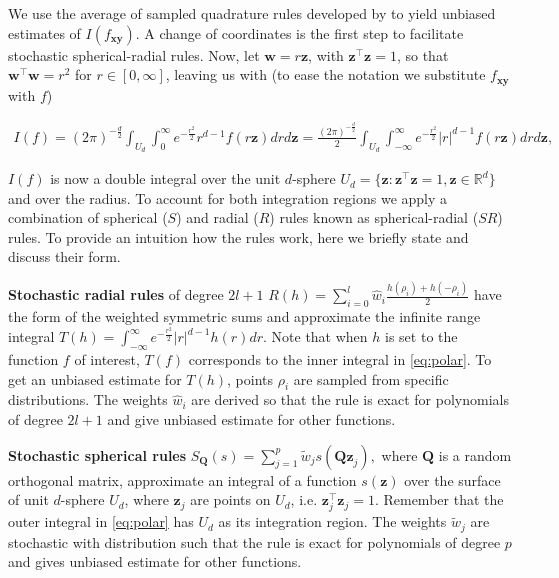 We use the average of sampled quadrature rules developed by \citep{genz1998stochastic} to yield unbiased estimates of $I(f_{\mathbf{xy}})$. A change of coordinates is the first step to facilitate stochastic spherical-radial rules. Now, let $\mathbf{w} = r\mathbf{z}$, with $\mathbf{z}^{\boldsymbol{\top}}\mathbf{z} = 1$, so that $\mathbf{w}^{\boldsymbol{\top}}\mathbf{w}=r^2$ for $r \in [0, \infty]$, leaving us with (to ease the notation we substitute $f_{\mathbf{xy}}$ with $f$)

\begin{equation}
\begin{split}
\label{eq:polar}
I(f) = (2\pi)^{-\frac{d}{2}} \int_{U_d} \int_{0}^{\infty} e^{-\frac{r^2}{2}} r^{d-1} f(r\mathbf{z})dr d\mathbf{z} =
\frac{(2\pi)^{-\frac{d}{2}}}{2} \int_{U_d} \int_{-\infty}^{\infty} e^{-\frac{r^2}{2}} |r|^{d-1} f(r\mathbf{z})dr d\mathbf{z},
\end{split}
\end{equation}

$I(f)$ is now a double integral over the unit $d$-sphere $U_d = \{\mathbf{z}: \mathbf{z}^{\boldsymbol{\top}}\mathbf{z} = 1, \mathbf{z} \in \mathbb{R}^d\}$ and over the radius. To account for both integration regions we apply a combination of spherical ($S$) and radial ($R$) rules known as spherical-radial ($SR$) rules. To provide an intuition how the rules work, here we briefly state and discuss their form.

\textbf{Stochastic radial rules} of degree ${2l+1}$ ${R(h) = \sum\limits_{i=0}^{l} \hat{w}_i \frac{h(\rho_i) + h(-\rho_i)}{2}}$ have the form of the weighted symmetric sums and approximate the infinite range integral ${T(h) = \int_{-\infty}^{\infty} e^{-\frac{r^2}{2}} |r|^{d-1} h(r) dr}$. Note that when $h$ is set to the function $f$ of interest, $T(f)$ corresponds to the inner integral in \eqref{eq:polar}.
To get an unbiased estimate for $T(h)$, points $\rho_i$ are sampled from specific distributions. The weights $\hat{w}_i$ are derived so that the rule is exact for polynomials of degree $2l + 1$ and give unbiased estimate for other functions.

\textbf{Stochastic spherical rules} ${S_\mathbf{Q}(s) = \sum\limits_{j=1}^{p} \widetilde{w}_j s(\mathbf{Qz}_j),}$ where 
$\mathbf{Q}$ is a random orthogonal matrix, approximate an integral of a function $s(\mathbf{z})$ over the surface of unit $d$-sphere $U_d$, where $\mathbf{z}_j$ are points on $U_d$, i.e. $\mathbf{z}_j^{\boldsymbol{\top}}\mathbf{z}_j = 1$. Remember that the outer integral in \eqref{eq:polar} has $U_d$ as its integration region. The weights $\widetilde{w}_j$ are stochastic with distribution such that the rule is exact for polynomials of degree $p$ and gives unbiased estimate for other functions.

